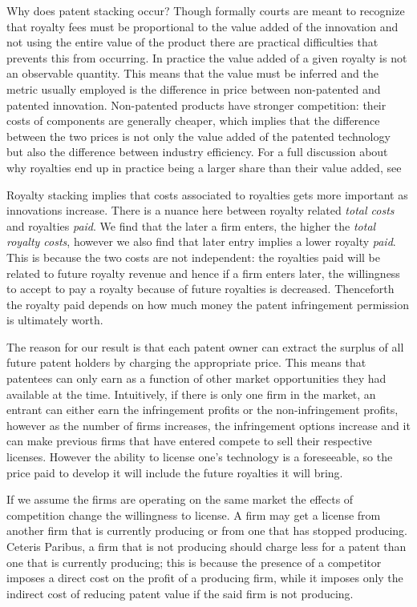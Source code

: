 \documentclass{article}
\begin{document}
Why does patent stacking occur? Though formally courts are meant to recognize that royalty fees must be proportional to the value added of the innovation and not using the entire value of the product there are practical difficulties that prevents this from occurring. In practice the value added of a given royalty is not an observable quantity. This means that the value must be inferred and the metric usually employed is the difference in price between non-patented and patented innovation. Non-patented products have stronger competition: their costs of components are generally cheaper, which implies that the difference between the two prices is not only the value added of the patented technology but also the difference between industry efficiency. For a full discussion about why royalties end up in practice being a larger share than their value added, see \cite{Elhauge2008}

Royalty stacking implies that costs associated to royalties gets more important as innovations increase. There is a nuance here between royalty related \textit{total costs} and royalties \textit{paid}. We find that the later a firm enters, the higher the \textit{total royalty costs}, however we also find that later entry implies a lower royalty \textit{paid}. This is because the two costs are not independent: the royalties paid will be related to future royalty revenue and hence if a firm enters later, the willingness to accept to pay a royalty because of future royalties is decreased. Thenceforth the royalty paid depends on how much money the patent infringement permission is ultimately worth. 

The reason for our result is that each patent owner can extract the surplus of all future patent holders by charging the appropriate price. This means that patentees can only earn as a function of other market opportunities they had available at the time. Intuitively, if there is only one firm in the market, an entrant can either earn the infringement profits or the non-infringement profits, however as the number of firms increases, the infringement options increase and it can make previous firms that have entered compete to sell their respective licenses. However the ability to license one's technology is a foreseeable, so the price paid to develop it will include the future royalties it will bring. 

If we assume the firms are operating on the same market the effects of competition change the willingness to license. A firm may get a license from another firm that is currently producing or from one that has stopped producing. Ceteris Paribus, a firm that is not producing should charge less for a patent than one that is currently producing; this is because the presence of a competitor imposes a direct cost on the profit of a producing firm, while it imposes only the indirect cost of reducing patent value if the said firm is not producing. 
\end{document}
